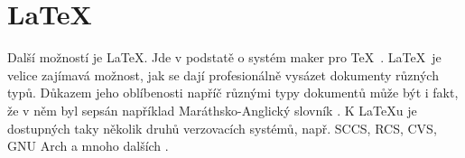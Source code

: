 \documentclass[11pt,a4paper,titlepage]{article}
\begin{document}
\section{\LaTeX}
Další možností je \LaTeX. Jde v podstatě o systém maker pro \TeX \ \cite{MKS:Jak_se_v_tom_vyznat}. \LaTeX \ je velice zajímavá možnost, jak se dají profesionálně vysázet dokumenty různých typů. Důkazem jeho oblíbenosti napříč různými typy dokumentů může být i fakt, že v něm byl sepsán například Maráthsko-Anglický slovník \cite{TeX_conf:Proc}. K \LaTeX u je dostupných taky několik druhů verzovacích systémů, např. SCCS, RCS, CVS, GNU Arch a mnoho dalších \cite{Divila:Revizni_system_pro_latex}.
\newpage

\end{document}
